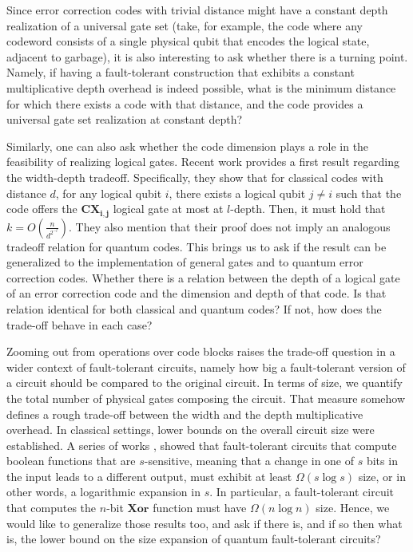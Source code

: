 \documentclass[manuscript,screen,review]{acmart}
\begin{document}
{Since error correction codes with trivial distance might have a constant depth realization of a universal gate set (take, for example, the code where any codeword consists of a single physical qubit that encodes the logical state, adjacent to garbage), it is also interesting to ask whether there is a turning point.
Namely, if having a fault-tolerant construction that exhibits a constant multiplicative depth overhead is indeed possible, what is the minimum distance for which there exists a code with that distance, and the code provides a universal gate set realization at constant depth?


Similarly, one can also ask whether the code dimension plays a role in the feasibility of realizing logical gates. Recent work \cite{krishna2025tradeoffsvolumefaulttolerantcircuits} provides a first result regarding the width-depth tradeoff. Specifically, they show that for classical codes with distance $d$, for any logical qubit $i$, there exists a logical qubit $j \neq i$ such that the code offers the $\mathbf{CX_{i,j}}$ logical gate at most at $l$-depth. Then, it must hold that $k = O\left(\frac{n}{d^{2^{-l}}}\right)$. They also mention that their proof does not imply an analogous tradeoff relation for quantum codes. This brings us to ask if the result can be generalized to the implementation of general gates and to quantum error correction codes. 
Whether there is a relation between the depth of a logical gate of an error correction code and the dimension and depth of that code. Is that relation identical for both classical and quantum codes? If not, how does the trade-off behave in each case?


Zooming out from operations over code blocks raises the trade-off question in a wider context of fault-tolerant circuits, namely how big a fault-tolerant version of a circuit should be compared to the original circuit. In terms of size, we quantify the total number of physical gates composing the circuit. That measure somehow defines a rough trade-off between the width and the depth multiplicative overhead. In classical settings, lower bounds on the overall circuit size were established. A series of works \cite{AnnaGal}, \cite{185425} showed that fault-tolerant circuits that compute boolean functions that are $s$-sensitive, meaning that a change in one of $s$ bits in the input leads to a different output, must exhibit at least $\Omega(s \log s)$ size, or in other words, a logarithmic expansion in $s$. In particular, a fault-tolerant circuit that computes the $n$-bit $\mathbf{Xor}$ function must have $\Omega(n \log n)$ size. Hence, we would like to generalize those results too, and ask if there is, and if so then what is, the lower bound on the size expansion of quantum fault-tolerant circuits?

}
\end{document}
